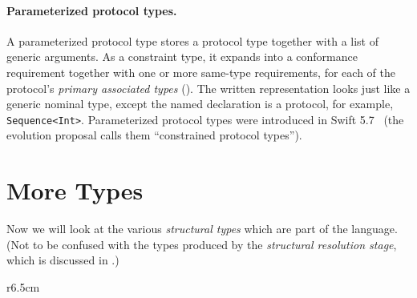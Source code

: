 \documentclass[../generics]{subfiles}
\begin{document}
\paragraph{Parameterized protocol types.}
A parameterized protocol type stores a protocol type together with a list of generic arguments. As a constraint type, it expands into a conformance requirement together with one or more same-type requirements, for each of the protocol's \emph{primary associated types} (). The written representation looks just like a generic nominal type, except the named declaration is a protocol, for example, \texttt{Sequence<Int>}. Parameterized protocol types were introduced in Swift 5.7~\cite{se0346} (the evolution proposal calls them ``constrained protocol types'').

\section{More Types}\label{more types}

Now we will look at the various \emph{structural types} which are part of the language. (Not to be confused with the types produced by the \emph{structural resolution stage}, which is discussed in .)

\begin{wrapfigure}[15]{r}{6.5cm}
\begin{center}
\end{center}
\end{wrapfigure}
\end{document}
